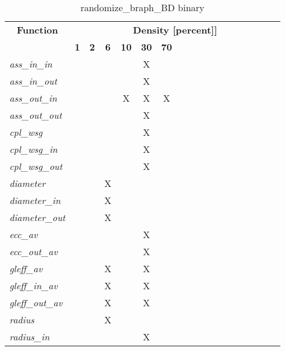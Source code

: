 \begin{table}[h] \centering \begin{tabular}{|l|c|c|c|c|c|c|} \hline\multicolumn{1}{|c|}{\textbf{\large{Function}}} & \multicolumn{17}{c|}{\large{\textbf{Density [percent]]}}}\\\cline{2-18}  & \textbf{1} &  \textbf{2} &  \textbf{6} &  \textbf{10} &  \textbf{30} &  \textbf{70} \\ \hline   \textit{ass\_in\_in} &   &   &   &   & X &   \\ \hline  \textit{ass\_in\_out} &   &   &   &   & X &   \\ \hline  \textit{ass\_out\_in} &   &   &   & X & X & X \\ \hline  \textit{ass\_out\_out} &   &   &   &   & X &   \\ \hline  \textit{cpl\_wsg} &   &   &   &   & X &   \\ \hline  \textit{cpl\_wsg\_in} &   &   &   &   & X &   \\ \hline  \textit{cpl\_wsg\_out} &   &   &   &   & X &   \\ \hline  \textit{diameter} &   &   & X &   &   &   \\ \hline  \textit{diameter\_in} &   &   & X &   &   &   \\ \hline  \textit{diameter\_out} &   &   & X &   &   &   \\ \hline  \textit{ecc\_av} &   &   &   &   & X &   \\ \hline  \textit{ecc\_out\_av} &   &   &   &   & X &   \\ \hline  \textit{gleff\_av} &   &   & X &   & X &   \\ \hline  \textit{gleff\_in\_av} &   &   & X &   & X &   \\ \hline  \textit{gleff\_out\_av} &   &   & X &   & X &   \\ \hline  \textit{radius} &   &   & X &   &   &   \\ \hline  \textit{radius\_in} &   &   &   &   & X &   \\ \hline \end{tabular}\caption{randomize\_braph\_BD binary}\label{tab:my_label} \end{table}